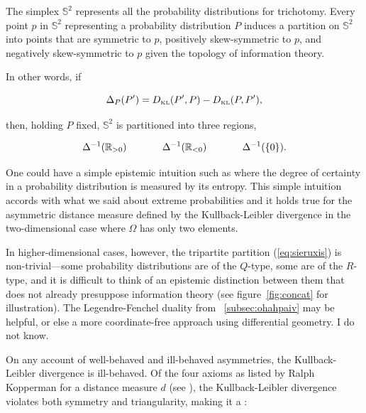 \documentclass[12pt]{article}
\begin{document}
The simplex $\mathbb{S}^{2}$ represents all the probability
distributions for trichotomy. Every point $p$ in $\mathbb{S}^{2}$
representing a probability distribution $P$ induces a partition on
$\mathbb{S}^{2}$ into points that are symmetric to $p$, positively
skew-symmetric to $p$, and negatively skew-symmetric to $p$ given the
topology of information theory.

In other words, if

\begin{equation}
  \label{eq:sksy}
  \Delta_{P}(P')=D_{\mbox{\tiny KL}}(P',P)-D_{\mbox{\tiny KL}}(P,P'),
\end{equation}

then, holding $P$ fixed, $\mathbb{S}^{2}$ is partitioned into three
regions,

\begin{equation}
  \label{eq:sieruxis}
  \Delta^{-1}(\mathbb{R}_{>0})\hspace{.5in}\Delta^{-1}(\mathbb{R}_{<0})\hspace{.5in}\Delta^{-1}(\{0\}).
\end{equation}

One could have a simple epistemic intuition such as 
where the degree of certainty in a probability distribution is
measured by its entropy. This simple intuition accords with what we
said about extreme probabilities and it holds true for the asymmetric
distance measure defined by the Kullback-Leibler divergence in the
two-dimensional case where $\Omega$ has only two elements.

In higher-dimensional cases, however, the tripartite partition
(\ref{eq:sieruxis}) is non-trivial---some probability distributions
are of the $Q$-type, some are of the $R$-type, and it is difficult to
think of an epistemic distinction between them that does not already
presuppose information theory (see figure~\ref{fig:concat} for
illustration). The Legendre-Fenchel duality from
{\ubsection}~\ref{subsec:ohahpaiv} may be helpful, or else a more
coordinate-free approach using differential geometry. I do not know.

On any account of well-behaved and ill-behaved asymmetries, the
Kullback-Leibler divergence is ill-behaved. Of the four axioms as
listed by Ralph Kopperman for a distance measure $d$ (see
), the Kullback-Leibler divergence violates
both symmetry and triangularity, making it a :
\end{document}
